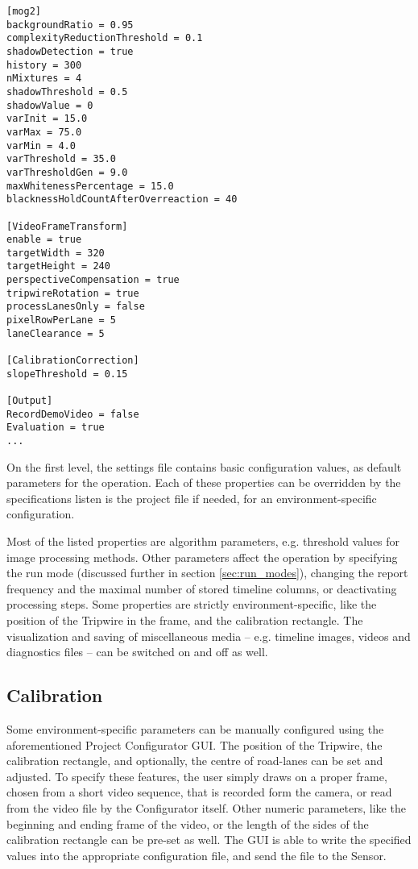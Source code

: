 \begin{lstlisting}[frame=single,float=!ht,caption={Part of a configuration file. Features are organized into sections, and presented as key--value pairs.},label=lst:config_file]
[mog2]
backgroundRatio = 0.95
complexityReductionThreshold = 0.1
shadowDetection = true
history = 300
nMixtures = 4
shadowThreshold = 0.5
shadowValue = 0
varInit = 15.0
varMax = 75.0
varMin = 4.0
varThreshold = 35.0
varThresholdGen = 9.0
maxWhitenessPercentage = 15.0
blacknessHoldCountAfterOverreaction = 40

[VideoFrameTransform]
enable = true
targetWidth = 320
targetHeight = 240
perspectiveCompensation = true
tripwireRotation = true
processLanesOnly = false
pixelRowPerLane = 5
laneClearance = 5

[CalibrationCorrection]
slopeThreshold = 0.15

[Output]
RecordDemoVideo = false
Evaluation = true
...
\end{lstlisting}

On the first level, the settings file contains basic configuration values, as default parameters for the operation.
Each of these properties can be overridden by the specifications listen is the project file if needed, for an environment-specific configuration.

Most of the listed properties are algorithm parameters, e.g. threshold values for image processing methods.
Other parameters affect the operation by specifying the run mode (discussed further in section \ref{sec:run_modes}), changing the report frequency and the maximal number of stored timeline columns, or deactivating processing steps.
Some properties are strictly environment-specific, like the position of the Tripwire in the frame, and the calibration rectangle.
The visualization and saving of miscellaneous media -- e.g. timeline images, videos and diagnostics files -- can be switched on and off as well.

\subsection{Calibration}\label{chap:calibration}
Some environment-specific parameters can be manually configured using the aforementioned Project Configurator GUI.
The position of the Tripwire, the calibration rectangle, and optionally, the centre of road-lanes can be set and adjusted.
To specify these features, the user simply draws on a proper frame, chosen from a short video sequence, that is recorded form the camera, or read from the video file by the Configurator itself.
Other numeric parameters, like the beginning and ending frame of the video, or the length of the sides of the calibration rectangle can be pre-set as well.
The GUI is able to write the specified values into the appropriate configuration file, and send the file to the Sensor. 

